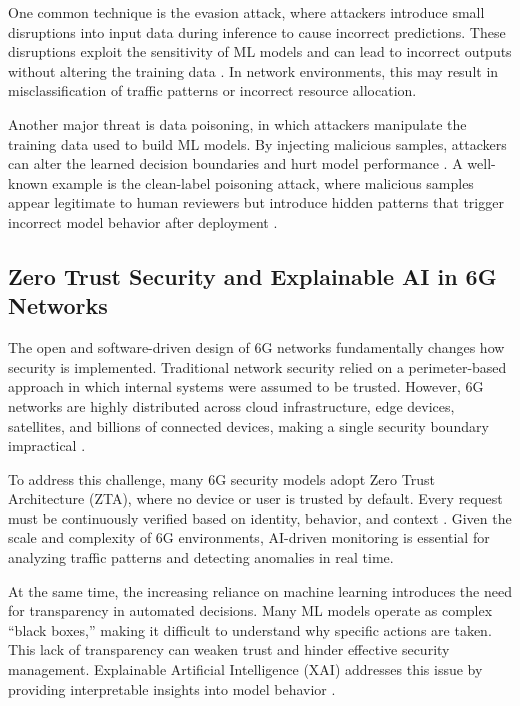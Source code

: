 \documentclass[letterpaper]{article} %
\begin{document}
One common technique is the evasion attack, where attackers introduce small disruptions into input data during inference to cause incorrect predictions. These disruptions exploit the sensitivity of ML models and can lead to incorrect outputs without altering the training data \cite{Catak_Catak_Moldsvor_2021}. In network environments, this may result in misclassification of traffic patterns or incorrect resource allocation.

Another major threat is data poisoning, in which attackers manipulate the training data used to build ML models. By injecting malicious samples, attackers can alter the learned decision boundaries and hurt model performance \cite{Chen_Zhang_Zhang_Wang_Liu_2021}. A well-known example is the clean-label poisoning attack, where malicious samples appear legitimate to human reviewers but introduce hidden patterns that trigger incorrect model behavior after deployment \cite{NEURIPS2018_22722a34}.

\subsection{Zero Trust Security and Explainable AI in 6G Networks}

The open and software-driven design of 6G networks fundamentally changes how security is implemented. Traditional network security relied on a perimeter-based approach in which internal systems were assumed to be trusted. However, 6G networks are highly distributed across cloud infrastructure, edge devices, satellites, and billions of connected devices, making a single security boundary impractical \cite{kaur2025}. 

To address this challenge, many 6G security models adopt Zero Trust Architecture (ZTA), where no device or user is trusted by default. Every request must be continuously verified based on identity, behavior, and context \cite{ali2025, kaur2025}. Given the scale and complexity of 6G environments, AI-driven monitoring is essential for analyzing traffic patterns and detecting anomalies in real time.

At the same time, the increasing reliance on machine learning introduces the need for transparency in automated decisions. Many ML models operate as complex ``black boxes,'' making it difficult to understand why specific actions are taken. This lack of transparency can weaken trust and hinder effective security management. Explainable Artificial Intelligence (XAI) addresses this issue by providing interpretable insights into model behavior \cite{kaur2025}.
\end{document}
